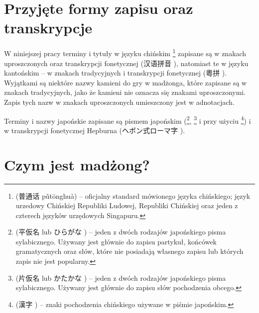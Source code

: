\introduction
\section{Przyjęte formy zapisu oraz transkrypcje}
W niniejszej pracy terminy i tytuły w języku chińskim
\footnote{ (普通话 pǔtōnghuà) -- oficjalny
standard mówionego języka chińskiego; język urzedowy Chińskiej Republiki
Ludowej, Republiki Chińskiej oraz jeden z czterech języków urzędowych
Singapuru.} zapisane są w znakach uproszczonych oraz transkrypcji fonetycznej
 (汉语拼音 ), natomiast te w języku
kantońskim -- w znakach tradycyjnych i transkrypcji fonetycznej
 (粵拼 ). Wyjątkami są niektóre nazwy
kamieni do gry w madżonga, które zapisane są w znakach tradycyjnych, jako że
kamieni nie oznacza się znakami uproszczonymi. Zapis tych nazw w znakach
uproszczonych umieszczony jest w adnotacjach.

Terminy i nazwy japońskie zapisane są pismem japońskim
(\footnote{ (平仮名 lub ひらがな )
-- jeden z dwóch rodzajów japońskiego pisma sylabicznego. Używany jest głównie do
zapisu partykuł, końcówek gramatycznych oraz słów, które nie posiadają
własnego zapisu  lub których zapis  nie jest
popularny.}, \footnote{ (片仮名 lub かたかな
) -- jeden z dwóch rodzajów japońskiego pisma sylabicznego.
Używany jest głównie do zapisu słów pochodzenia obcego.} i przy użyciu
\footnote{ (漢字 ) -- znaki pochodzenia
chińskiego używane w piśmie japońskim.})  i w
transkrypcji fonetycznej Hepburna (ヘボン式ローマ字 ).
\section{Czym jest madżong?}
